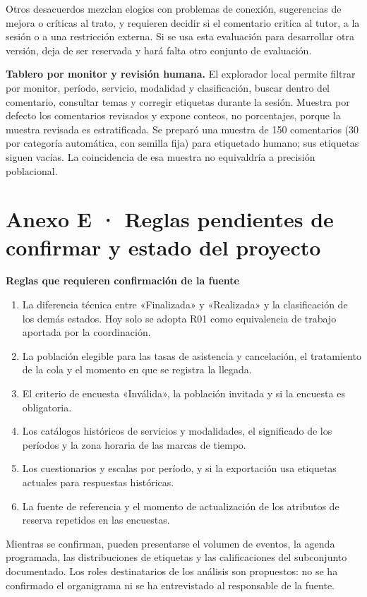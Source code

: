 \documentclass[11pt,letterpaper]{article}
\begin{document}
Otros desacuerdos mezclan elogios con problemas de conexión, sugerencias de mejora o críticas al trato, y requieren decidir si el comentario critica al tutor, a la sesión o a una restricción externa. Si se usa esta evaluación para desarrollar otra versión, deja de ser reservada y hará falta otro conjunto de evaluación.

\textbf{Tablero por monitor y revisión humana.} El explorador local permite filtrar por monitor, período, servicio, modalidad y clasificación, buscar dentro del comentario, consultar temas y corregir etiquetas durante la sesión. Muestra por defecto los comentarios revisados y expone conteos, no porcentajes, porque la muestra revisada es estratificada. Se preparó una muestra de 150 comentarios (30 por categoría automática, con semilla fija) para etiquetado humano; sus etiquetas siguen vacías. La coincidencia de esa muestra no equivaldría a precisión poblacional.

\section*{Anexo E · Reglas pendientes de confirmar y estado del proyecto}

\textbf{Reglas que requieren confirmación de la fuente}

\begin{enumerate}[leftmargin=1.5em,itemsep=2pt]
\item La diferencia técnica entre «Finalizada» y «Realizada» y la clasificación de los demás estados. Hoy solo se adopta R01 como equivalencia de trabajo aportada por la coordinación.
\item La población elegible para las tasas de asistencia y cancelación, el tratamiento de la cola y el momento en que se registra la llegada.
\item El criterio de encuesta «Inválida», la población invitada y si la encuesta es obligatoria.
\item Los catálogos históricos de servicios y modalidades, el significado de los períodos y la zona horaria de las marcas de tiempo.
\item Los cuestionarios y escalas por período, y si la exportación usa etiquetas actuales para respuestas históricas.
\item La fuente de referencia y el momento de actualización de los atributos de reserva repetidos en las encuestas.
\end{enumerate}

Mientras se confirman, pueden presentarse el volumen de eventos, la agenda programada, las distribuciones de etiquetas y las calificaciones del subconjunto documentado. Los roles destinatarios de los análisis son propuestos: no se ha confirmado el organigrama ni se ha entrevistado al responsable de la fuente.
\end{document}
